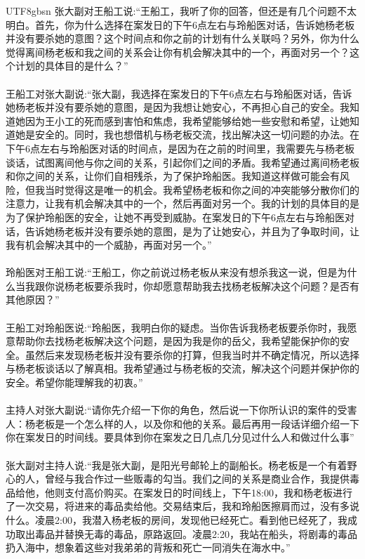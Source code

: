 \documentclass[11pt]{article}
\begin{document}
{\begin{CJK}{UTF8}{gbsn}
张大副对王船工说:``王船工，我听了你的回答，但还是有几个问题不太明白。首先，你为什么选择在案发日的下午6点左右与玲船医对话，告诉她杨老板并没有要杀她的意图？这个时间点和你之前的计划有什么关联吗？另外，你为什么觉得离间杨老板和我之间的关系会让你有机会解决其中的一个，再面对另一个？这个计划的具体目的是什么？''\\ \\
王船工对张大副说:``张大副，我选择在案发日的下午6点左右与玲船医对话，告诉她杨老板并没有要杀她的意图，是因为我想让她安心，不再担心自己的安全。我知道她因为王小工的死而感到害怕和焦虑，我希望能够给她一些安慰和希望，让她知道她是安全的。同时，我也想借机与杨老板交流，找出解决这一切问题的办法。在下午6点左右与玲船医对话的时间点，是因为在之前的时间里，我需要先与杨老板谈话，试图离间他与你之间的关系，引起你们之间的矛盾。我希望通过离间杨老板和你之间的关系，让你们自相残杀，为了保护玲船医。我知道这样做可能会有风险，但我当时觉得这是唯一的机会。我希望杨老板和你之间的冲突能够分散你们的注意力，让我有机会解决其中的一个，然后再面对另一个。我的计划的具体目的是为了保护玲船医的安全，让她不再受到威胁。在案发日的下午6点左右与玲船医对话，告诉她杨老板并没有要杀她的意图，是为了让她安心，并且为了争取时间，让我有机会解决其中的一个威胁，再面对另一个。''\\ \\
玲船医对王船工说:``王船工，你之前说过杨老板从来没有想杀我这一说，但是为什么当我跟你说杨老板要杀我时，你却愿意帮助我去找杨老板解决这个问题？是否有其他原因？''\\ \\
王船工对玲船医说:``玲船医，我明白你的疑虑。当你告诉我杨老板要杀你时，我愿意帮助你去找杨老板解决这个问题，是因为我是你的岳父，我希望能保护你的安全。虽然后来发现杨老板并没有要杀你的打算，但我当时并不确定情况，所以选择与杨老板谈话以了解真相。我希望通过与杨老板的交流，解决这个问题并保护你的安全。希望你能理解我的初衷。''\\ \\
主持人对张大副说:``请你先介绍一下你的角色，然后说一下你所认识的案件的受害人：杨老板是一个怎么样的人，以及你和他的关系。最后再用一段话详细介绍一下你在案发日的时间线。要具体到你在案发之日几点几分见过什么人和做过什么事''\\ \\
张大副对主持人说:``我是张大副，是阳光号邮轮上的副船长。杨老板是一个有着野心的人，曾经与我合作过一些贩毒的勾当。我们之间的关系是商业合作，我提供毒品给他，他则支付高价购买。在案发日的时间线上，下午18:00，我和杨老板进行了一次交易，将进来的毒品卖给他。交易结束后，我和玲船医擦肩而过，没有多说什么。凌晨2:00，我潜入杨老板的房间，发现他已经死亡。看到他已经死了，我成功取出毒品并替换无毒的毒品，原路返回。凌晨2:20，我站在船头，将剧毒的毒品扔入海中，想象着这些对我弟弟的背叛和死亡一同消失在海水中。''\\ \\

\end{CJK}}
\end{document}
